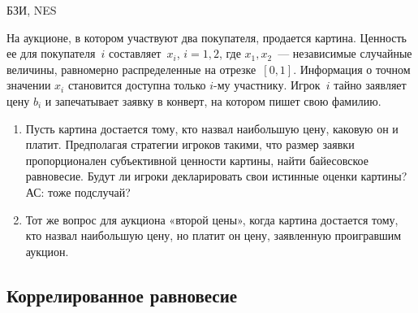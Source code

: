 \begin{problem}
\begin{source}
БЗИ, NES
\end{source} На аукционе, в
котором участвуют два покупателя, продается картина.
Ценность ее для покупателя~$i$ составляет~$x_i$, $i=1,2$,
где $x_1,x_2$~— независимые случайные величины,
равномерно распределенные на отрезке~$[0,1]$. Информация о точном значении $x_i$ становится доступна только $i$-му участнику. Игрок~$i$ тайно
заявляет цену $b_i$ и запечатывает заявку в конверт, на
котором пишет свою фамилию.

\begin{enumerate}

\item Пусть картина достается тому, кто назвал наибольшую
цену, каковую он и платит. Предполагая стратегии игроков
такими, что размер заявки пропорционален субъективной
ценности картины, найти байесовское равновесие. Будут ли
игроки декларировать свои истинные оценки картины?
{\red АС: тоже подслучай?}

\item Тот же вопрос для аукциона «второй цены», когда
картина достается тому, кто назвал наибольшую цену, но
платит он цену, заявленную проигравшим аукцион.

\end{enumerate}








\begin{sol}

\end{sol}
\end{problem}



\subsection{Коррелированное равновесие}

